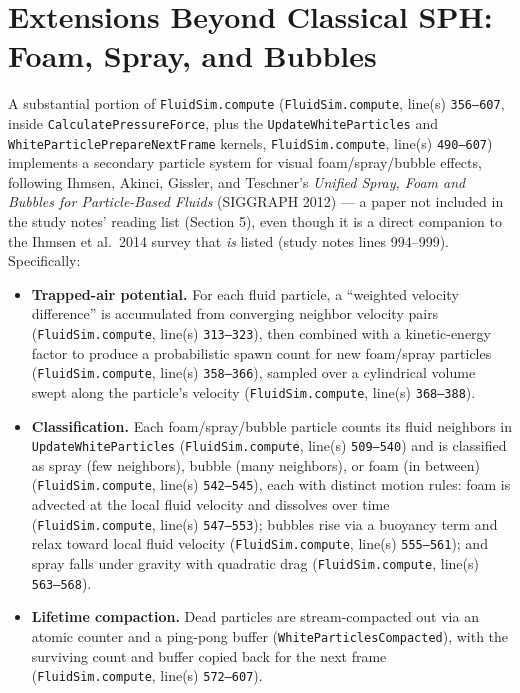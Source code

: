 \documentclass[11pt]{article}
\newcommand{\file}[1]{\texttt{#1}}
\newcommand{\loc}[2]{\texttt{#1}, line(s) \texttt{#2}}
\begin{document}
\section{Extensions Beyond Classical SPH: Foam, Spray, and Bubbles}

A substantial portion of \file{FluidSim.compute}
(\loc{FluidSim.compute}{356--607}, inside \texttt{CalculatePressureForce},
plus the \texttt{UpdateWhiteParticles} and
\texttt{WhiteParticlePrepareNextFrame} kernels,
\loc{FluidSim.compute}{490--607}) implements a secondary particle system for
visual foam/spray/bubble effects, following Ihmsen, Akinci, Gissler, and
Teschner's \emph{Unified Spray, Foam and Bubbles for Particle-Based Fluids}
(SIGGRAPH 2012) --- a paper not included in the study notes' reading list
(Section 5), even though it is a direct companion to the Ihmsen et al.\ 2014
survey that \emph{is} listed (study notes lines 994--999). Specifically:

\begin{itemize}
    \item \textbf{Trapped-air potential.} For each fluid particle, a
    ``weighted velocity difference'' is accumulated from converging
    neighbor velocity pairs (\loc{FluidSim.compute}{313--323}), then combined
    with a kinetic-energy factor to produce a probabilistic spawn count for
    new foam/spray particles (\loc{FluidSim.compute}{358--366}), sampled over
    a cylindrical volume swept along the particle's velocity
    (\loc{FluidSim.compute}{368--388}).
    \item \textbf{Classification.} Each foam/spray/bubble particle counts its
    fluid neighbors in \texttt{UpdateWhiteParticles}
    (\loc{FluidSim.compute}{509--540}) and is classified as spray (few
    neighbors), bubble (many neighbors), or foam (in between)
    (\loc{FluidSim.compute}{542--545}), each with distinct motion rules:
    foam is advected at the local fluid velocity and dissolves over time
    (\loc{FluidSim.compute}{547--553}); bubbles rise via a buoyancy term and
    relax toward local fluid velocity (\loc{FluidSim.compute}{555--561}); and
    spray falls under gravity with quadratic drag
    (\loc{FluidSim.compute}{563--568}).
    \item \textbf{Lifetime compaction.} Dead particles are stream-compacted
    out via an atomic counter and a ping-pong buffer
    (\texttt{WhiteParticlesCompacted}), with the surviving count and buffer
    copied back for the next frame (\loc{FluidSim.compute}{572--607}).
\end{itemize}
\end{document}
